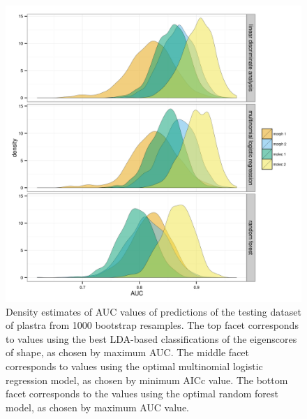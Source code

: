 \documentclass[12pt,letterpaper]{article}\usepackage{graphicx, color}
\begin{document}
\begin{figure}[ht]
  \centering
  \includegraphics[width = \textwidth]{figure/gen_res}
  \caption{Density estimates of AUC values of predictions of the testing dataset of plastra from 1000 bootstrap resamples. The top facet corresponds to values using the best LDA-based classifications of the eigenscores of shape, as chosen by maximum AUC. The middle facet corresponds to values using the optimal multinomial logistic regression model, as chosen by minimum AICc value. The bottom facet corresponds to the values using the optimal random forest model, as chosen by maximum AUC value.}
  \label{fig:gen_res}
\end{figure}
\end{document}

